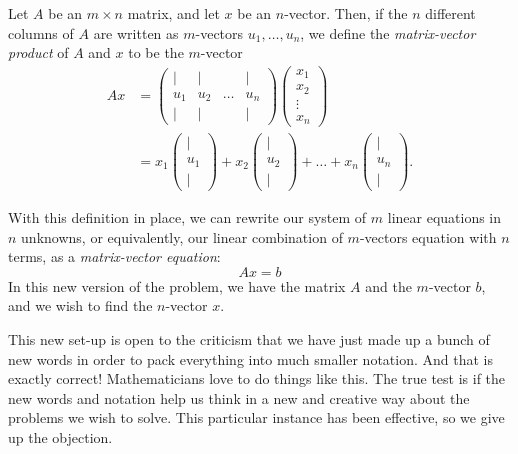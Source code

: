 \documentclass[00-livre-main.tex]{subfiles}
\begin{document}
\begin{definition}
Let $A$ be an $m\times n$ matrix, and let $x$ be an $n$-vector. Then, if the $n$ different columns of $A$ are written as $m$-vectors $u_1, \ldots, u_n$, we define
the \emph{matrix-vector product} of $A$ and $x$ to be the $m$-vector
\[
\begin{aligned}
Ax & = \begin{pmatrix} | & | &  & | \\ u_1 & u_2 & \dots & u_n \\ | & | &  & | 
\end{pmatrix} \begin{pmatrix} x_1\\ x_2 \\ \vdots \\ x_n \end{pmatrix}  \\
& = x_1 \begin{pmatrix} |  \\ u_1 \\ | \end{pmatrix} + x_2 \begin{pmatrix} |  \\ u_2 \\ | \end{pmatrix} + \dots + x_n \begin{pmatrix} |  \\ u_n \\ | \end{pmatrix}.
\end{aligned}
\]
\end{definition}

With this definition in place, we can rewrite our system of $m$ linear equations in $n$ unknowns, or equivalently, our linear combination of $m$-vectors equation with $n$ terms, as a \emph{matrix-vector equation}:
\[
Ax = b
\]
In this new version of the problem, we have the matrix $A$ and the $m$-vector $b$, and we wish to find the $n$-vector $x$.

This new set-up is open to the criticism that we have just made up a bunch of new words in order to pack everything into much smaller notation. And that is exactly correct! Mathematicians love to do things like this. The true test is if the new words and notation help us think in a new and creative way about the problems we wish to solve. This particular instance has been effective, so we give up the objection.
\end{document}
